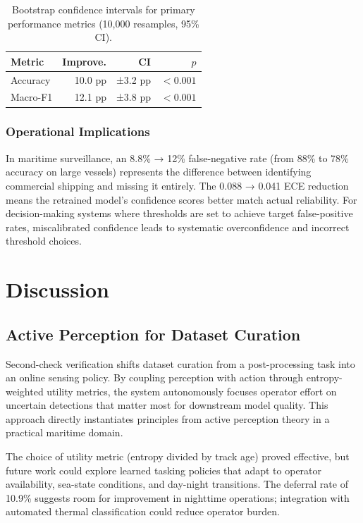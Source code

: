 \documentclass[conf]{asmeconf}
\begin{document}
\begin{table}[t]
\caption{Bootstrap confidence intervals for primary performance metrics (10,000 resamples, 95\% CI).}
\label{tab:significance}
\centering
\small
\begin{tabular}{@{}lrrr@{}}
\toprule
Metric & Improve. & CI & $p$ \\
\midrule
Accuracy & 10.0 pp & ±3.2 pp & $<0.001$ \\
\midrule
Macro-F1 & 12.1 pp & ±3.8 pp & $<0.001$ \\
\bottomrule
\end{tabular}
\end{table}

\subsubsection{Operational Implications}

In maritime surveillance, an 8.8\% → 12\% false-negative rate (from 88\% to 78\% accuracy on large vessels) represents the difference between identifying commercial shipping and missing it entirely. The 0.088 → 0.041 ECE reduction means the retrained model's confidence scores better match actual reliability. For decision-making systems where thresholds are set to achieve target false-positive rates, miscalibrated confidence leads to systematic overconfidence and incorrect threshold choices.

\section{Discussion}

\subsection{Active Perception for Dataset Curation}

Second-check verification shifts dataset curation from a post-processing task into an online sensing policy. By coupling perception with action through entropy-weighted utility metrics, the system autonomously focuses operator effort on uncertain detections that matter most for downstream model quality. This approach directly instantiates principles from active perception theory \cite{Bajcsy1988ActivePerception, BajcsyAloimonosTsotsos2016Revisiting} in a practical maritime domain.

The choice of utility metric (entropy divided by track age) proved effective, but future work could explore learned tasking policies that adapt to operator availability, sea-state conditions, and day-night transitions. The deferral rate of 10.9\% suggests room for improvement in nighttime operations; integration with automated thermal classification could reduce operator burden.
\end{document}
